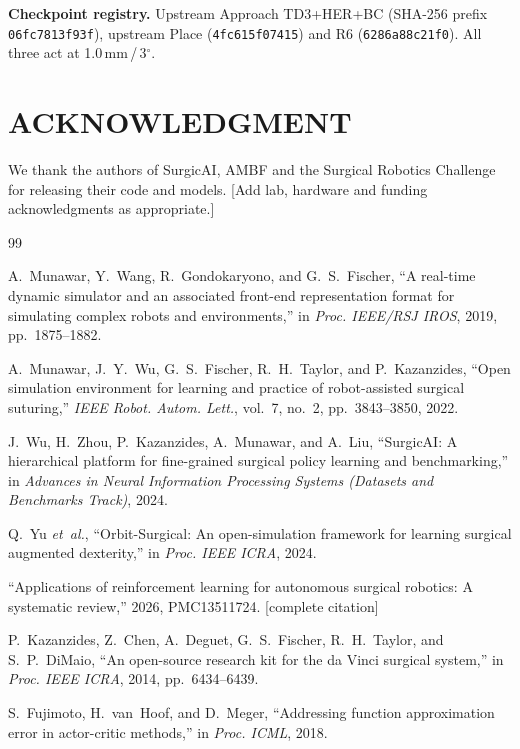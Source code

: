 \documentclass[letterpaper, 10 pt, conference]{ieeeconf}  %
\newcommand{\todo}[1]{{\color{cRed}[#1]}}
\begin{document}
\textbf{Checkpoint registry.} Upstream Approach TD3+HER+BC
(SHA-256 prefix \texttt{06fc7813f93f}), upstream Place (\texttt{4fc615f07415})
and R6 (\texttt{6286a88c21f0}). All three act at 1.0\,mm\,/\,3$^\circ$.


\section*{ACKNOWLEDGMENT}

We thank the authors of SurgicAI, AMBF and the Surgical Robotics Challenge for
releasing their code and models. \todo{Add lab, hardware and funding
acknowledgments as appropriate.}


\begin{thebibliography}{99}

A.~Munawar, Y.~Wang, R.~Gondokaryono, and G.~S.~Fischer, ``A real-time dynamic
simulator and an associated front-end representation format for simulating
complex robots and environments,'' in \emph{Proc. IEEE/RSJ IROS}, 2019,
pp.~1875--1882.

A.~Munawar, J.~Y.~Wu, G.~S.~Fischer, R.~H.~Taylor, and P.~Kazanzides, ``Open
simulation environment for learning and practice of robot-assisted surgical
suturing,'' \emph{IEEE Robot. Autom. Lett.}, vol.~7, no.~2, pp.~3843--3850, 2022.

J.~Wu, H.~Zhou, P.~Kazanzides, A.~Munawar, and A.~Liu, ``SurgicAI: A hierarchical
platform for fine-grained surgical policy learning and benchmarking,'' in
\emph{Advances in Neural Information Processing Systems (Datasets and Benchmarks
Track)}, 2024.

Q.~Yu \emph{et~al.}, ``Orbit-Surgical: An open-simulation framework for learning
surgical augmented dexterity,'' in \emph{Proc. IEEE ICRA}, 2024.

``Applications of reinforcement learning for autonomous surgical robotics: A
systematic review,'' 2026, PMC13511724. \todo{complete citation}

P.~Kazanzides, Z.~Chen, A.~Deguet, G.~S.~Fischer, R.~H.~Taylor, and
S.~P.~DiMaio, ``An open-source research kit for the da Vinci surgical system,''
in \emph{Proc. IEEE ICRA}, 2014, pp.~6434--6439.

S.~Fujimoto, H.~van~Hoof, and D.~Meger, ``Addressing function approximation
error in actor-critic methods,'' in \emph{Proc. ICML}, 2018.


\end{thebibliography}
\end{document}

